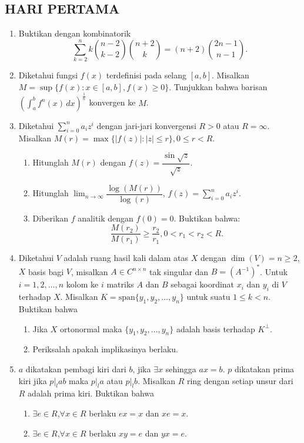 \documentclass[12pt,twoside]{article}
\begin{document}
\subsection{HARI PERTAMA}
\begin{enumerate}
    \item Buktikan dengan kombinatorik
          $$\sum_{k=2}^{n}k\binom{n-2}{k-2}\binom{n+2}{k}=(n+2)\binom{2n-1}{n-1}.$$

    \item Diketahui fungsi $f(x)$ terdefinisi pada selang $[a,b]$. Misalkan $M=\sup\{f(x):x\in [a,b],f(x)\geq 0\}$. Tunjukkan bahwa barisan $\left(\displaystyle\int_{a}^{b}f^n(x)\,dx\right)^{\frac{1}{n}}$ konvergen ke $M$.

    \item Diketahui $\displaystyle \sum_{i=0}^{n}a_iz^i$ dengan jari-jari konvergensi $R>0$ atau $R=\infty$.\\ Misalkan $M(r)=\max\{|f(z)|:|z|\leq r \},0\leq r<R$.
          \begin{enumerate}
              \item [(a)] Hitunglah $M(r)$ dengan $f(z)=\dfrac{\sin \sqrt{z}}{\sqrt{z}}$.
              \item[(b)] Hitunglah $\displaystyle \lim_{n\to\infty}\dfrac{\log\left(M(r)\right)}{\log(r)}$, $f(z)=\displaystyle\sum_{i=0}^{n}a_iz^i$.
              \item[(c)] Diberikan $f$ analitik dengan $f(0)=0$. Buktikan bahwa:$$\dfrac{M(r_2)}{M(r_1)}\geq \dfrac{r_2}{r_1},0<r_1<r_2<R.$$

          \end{enumerate}

    \item Diketahui $V$ adalah ruang hasil kali dalam atas $X$ dengan $\dim(V)=n\geq 2$, $X$ basis bagi $V$, misalkan $A\in C^{n\times n}$ tak singular dan $B=(A^{-1})^{*}$. Untuk $i=1,2,\dots,n$ kolom ke $i$ matriks $A$ dan $B$ sebagai koordinat $x_i$ dan $y_i$ di $V$ terhadap $X$. Misalkan $K=\text{span} \{y_1,y_2,\dots,y_n\}$ untuk suatu $1\leq k<n$. Buktikan bahwa
          \begin{enumerate}
              \item [(a)] Jika $X$ ortonormal maka $\{y_1,y_2,\dots,y_n\}$ adalah basis terhadap $K^{\bot}$.
              \item[(b)] Periksalah apakah implikasinya berlaku.
          \end{enumerate}

    \item $a$ dikatakan pembagi kiri dari $b$, jika $\exists x$ sehingga $ax=b$. $p$ dikatakan prima kiri jika $p|_lab$ maka $p|_la$ atau $p|_lb$. Misalkan $R$ ring dengan setiap unsur dari $R$ adalah prima kiri. Buktikan bahwa
          \begin{enumerate}
              \item [(a)] $\exists e\in R$,$\forall x\in R$ berlaku $ex=x$ dan $xe=x$.
              \item[(b)] $\exists e\in R$,$\forall x\in R$ berlaku $xy=e$ dan $yx=e$.
          \end{enumerate}
\end{enumerate}
\newpage
\end{document}
